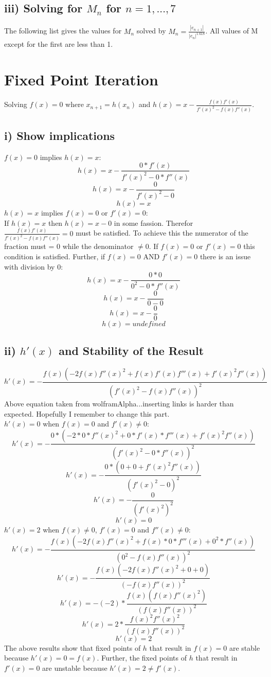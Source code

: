 \documentclass[12pt]{article}
\def\myoutput#1{{\fontsize{10}{11}\selectfont\verbatimtabinput{#1}}}
\begin{document}
\subsection*{iii) Solving for $M_n$ for $n=1,...,7$}
The following list gives the values for $M_n$ solved by $M_n=\frac{|e_{n+1}|}{|e_n|^{1.618}}$.
\myoutput{secantM.out}
\noindent
All values of M except for the first are less than 1.

\section{Fixed Point Iteration}
Solving $f(x)=0$ where $x_{n+1}=h(x_n)$ and $h(x)=x-\frac{f(x)f'(x)}{f'(x)^2-f(x)f''(x)}$.
\subsection*{i) Show implications}
$f(x)=0$ implies $h(x)=x$:
\[h(x)=x-\frac{0*f'(x)}{f'(x)^2-0*f''(x)}\]
\[h(x)=x-\frac{0}{f'(x)^2-0}\]
\[h(x)=x\]
$h(x)=x$ implies $f(x)=0$ or $f'(x)=0$:\\
If $h(x)=x$ then $h(x)=x-0$ in some fassion. Therefor $\frac{f(x)f'(x)}{f'(x)^2-f(x)f''(x)}=0$ must be satisfied. To achieve this the numerator of the fraction must = 0 while the denominator $\neq{0}$. If $f(x)=0$ or $f'(x)=0$ this condition is satisfied. Further, if $f(x)=0$ AND $f'(x)=0$ there is an issue with division by 0:
\[h(x)=x-\frac{0*0}{0^2-0*f''(x)}\]
\[h(x)=x-\frac{0}{0-0}\]
\[h(x)=x-\frac{0}{0}\]
\[h(x)=undefined\]
\subsection*{ii) $h'(x)$ and Stability of the Result}
\[h'(x)=-\frac{f(x)(-2f(x)f''(x)^2+f(x)f'(x)f'''(x)+f'(x)^2f''(x))}{(f'(x)^2-f(x)f''(x))^2}\]
Above equation taken from wolframAlpha...inserting links is harder than expected. Hopefully I remember to change this part.\\
$h'(x)=0$ when $f(x)=0$ and $f'(x)\neq{0}$:
\[h'(x)=-\frac{0*(-2*0*f''(x)^2+0*f'(x)*f'''(x)+f'(x)^2f''(x))}{(f'(x)^2-0*f''(x))^2}\]
\[h'(x)=-\frac{0*(0+0+f'(x)^2f''(x))}{(f'(x)^2-0)^2}\]
\[h'(x)=-\frac{0}{(f'(x)^2)^2}\]
\[h'(x)=0\]
$h'(x)=2$ when $f(x)\neq{0}$, $f'(x)=0$ and $f''(x)\neq{0}$:
\[h'(x)=-\frac{f(x)(-2f(x)f''(x)^2+f(x)*0*f'''(x)+0^2*f''(x))}{(0^2-f(x)f''(x))^2}\]
\[h'(x)=-\frac{f(x)(-2f(x)f''(x)^2+0+0)}{(-f(x)f''(x))^2}\]
\[h'(x)=-(-2)*\frac{f(x)(f(x)f''(x)^2)}{(f(x)f''(x))^2}\]
\[h'(x)=2*\frac{f(x)^2f''(x)^2}{(f(x)f''(x))^2}\]
\[h'(x)=2\]
The above results show that fixed points of $h$ that result in $f(x)=0$ are stable because $h'(x)=0=f(x)$. Further, the fixed points of $h$ that result in $f'(x)=0$ are unstable because $h'(x)=2\neq{f'(x)}$.
\end{document}
